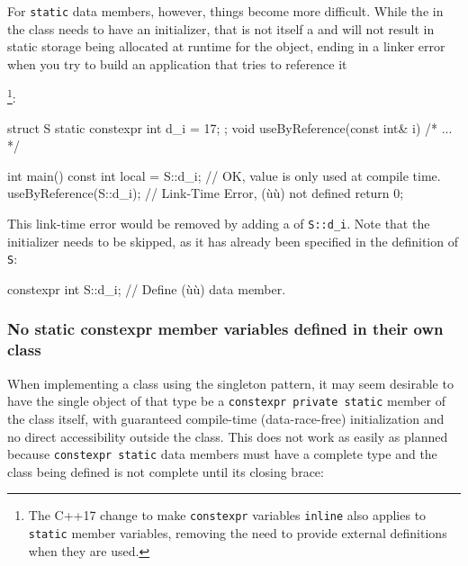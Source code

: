 For \lstinline!static! data members, however, things become more difficult.  While the  in the
class  needs to have an initializer, that is not itself a  and will
not result in static storage being allocated at runtime for the object, ending in a linker error when you try to
build an application that tries to reference it{\cprotect\footnote{The C++17 change to make \lstinline!constexpr! variables \lstinline!inline! also applies
to \lstinline!static! member variables, removing the need to provide external definitions when they are used.}:


\begin{emcppslisting}[emcppsbatch=e4]
struct S {
    static constexpr int d_i = 17;
};
void useByReference(const int& i) { /* ... */ }

int main()
{
    const int local = S::d_i;  // OK, value is only used at compile time.
    useByReference(S::d_i);    // Link-Time Error, (ù{}ù) not defined
    return 0;
}
\end{emcppslisting}

This link-time error would be removed by adding a  of \lstinline!S::d_i!.  Note that the
initializer needs to be skipped, as it has already been specified in the definition of \lstinline!S!:

\begin{emcppslisting}[emcppsbatch=e4]
constexpr int S::d_i;  // Define (ù{}ù) data member.
\end{emcppslisting}

\subsubsection[No static \lstinline!constexpr! member variables defined in their own class]{No static {\SubsubsecCode constexpr} member variables defined in their own class}\label{no-static-constexpr-member-variables-defined-in-their-own-class}

When implementing a class using the singleton pattern, it may seem
desirable to have the single object of that type be a
\lstinline!constexpr!~\lstinline!private!~\lstinline!static! member of the class
itself, with guaranteed compile-time (data-race-free) initialization and
no direct accessibility outside the class. This does not work as easily
as planned because \lstinline!constexpr!~\lstinline!static! data members must
have a complete type and the class being defined is not complete until
its closing brace:

}
